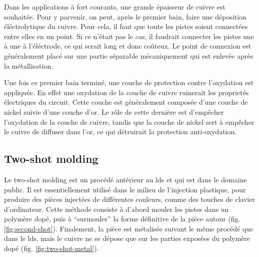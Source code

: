 Dans les applications à fort courants, une grande épaisseur de cuivre est souhaitée.
Pour y parvenir, on peut, après le premier bain, faire une déposition éléctrolytique du cuivre.
Pour cela, il faut que toute les pistes soient connectées entre elles en un point.
Si ce n'était pas le cas, il faudrait connecter les pistes une à une à l'éléctrode, ce qui serait long et donc coûteux.
Le point de connexion est généralement placé sur une partie séparable mécaniquement qui est enlevée après la métallisation.

Une fois ce premier bain terminé, une couche de protection contre l'oxydation est appliquée.
En effet une oxydation de la couche de cuivre ruinerait les proprietés électriques du circuit.
Cette couche est généralement composée d'une couche de nickel suivie d'une couche d'or.
Le rôle de cette dernière est d'empêcher l'oxydation de la couche de cuivre, tandis que la couche de nickel sert à empêcher le cuivre de diffuser dans l'or, ce qui détruirait la protection anti-oxydation.

\subsection{Two-shot molding}
Le two-shot molding est un procédé antérieur au \gls{lds} et qui est dans le domaine public.
Il est essentiellement utilisé dans le milieu de l'injection plastique, pour produire des pièces injectées de différentes couleurs, comme des touches de clavier d'ordinateur.
Cette méthode consiste à d'abord mouler les pistes dans un polymère dopé, puis à ``surmouler'' la forme définitive de la pièce autour (fig. \ref{fig:second-shot}).
Finalement, la pièce est métalisée suivant le même procédé que dans le \gls{lds}, mais le cuivre ne se dépose que sur les parties exposées du polymère dopé (fig. \ref{fig:two-shot-metal}).



